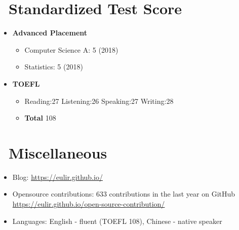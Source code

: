 \documentclass{resume}
\begin{document}
\section{\faUsers\ Standardized Test Score}
\begin{itemize}[parsep=0.5ex]
  \item \textbf{Advanced Placement}
		\begin{itemize}
		  \item Computer Science A: 5 (2018)
		  \item Statistics: 5 (2018)
		\end{itemize}
  \item \textbf{TOEFL}
		\begin{itemize}
		  \item Reading:27 Listening:26 Speaking:27 Writing:28
		  \item \textbf{Total} 108
		\end{itemize}
\end{itemize}

\section{\faInfo\ Miscellaneous}
\begin{itemize}[parsep=0.5ex]
  \item Blog: \url{https://eulir.github.io/}
  \item Opensource contributions: 633 contributions in the last year on GitHub \url{https://eulir.github.io/open-source-contribution/} 
  \item Languages: English - fluent (TOEFL 108), Chinese - native speaker
\end{itemize}
\end{document}

